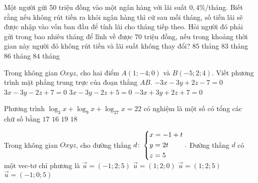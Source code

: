 \begin{ex}%
 Một người gửi 50 triệu đồng vào một ngân hàng với lãi suất $0,4\%$/tháng. Biết rằng nếu không rút tiền ra khỏi ngân hàng thì cứ sau mỗi tháng, số tiền lãi sẽ được nhập vào vốn ban đầu để tính lãi cho tháng tiếp theo. Hỏi người đó phải gửi trong bao nhiêu tháng để lĩnh về được $70$ triệu đồng, nếu trong khoảng thời gian này người đó không rút tiền và lãi suất không thay đổi?
\choice
{\True $85$ tháng}
{$83$ tháng}
{$86$ tháng}
{$84$ tháng}
\end{ex}
\begin{ex}%
 Trong không gian $Oxyz$, cho hai điểm $A(1;-4;0)$ và $B(-5;2;4)$. Viết phương trình mặt phẳng trung trực của đoạn thẳng $AB$.
\choice
{$-3x-3y+2z-7=0$}
{\True $3x-3y-2z+7=0$}
{$3x-3y-2z+5=0$}
{$-3x+3y+2z+7=0$}
\end{ex}
\begin{ex}%
 Phương trình $\log_3x+\log_9x+\log_{27}x=22$ có nghiệm là một số có tổng các chữ số bằng
\choice
{$17$}
{$16$}
{$19$}
{\True $18$}
\end{ex}
\begin{ex}%
 Trong không gian $Oxyz$, cho đường thẳng $d\colon\left\{\begin{aligned}& x=-1+t \\& y=2t \\& z=5\end{aligned}\right..$ Đường thẳng $d$ có một vec-tơ chỉ phương là
\choice
{$\overrightarrow{u}=(-1;2;5)$}
{\True $\overrightarrow{u}=(1;2;0)$}
{$\overrightarrow{u}=(1;2;5)$}
{$\overrightarrow{u}=(-1;0;5)$}
\end{ex}

